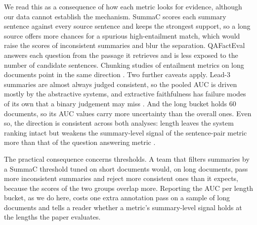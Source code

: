 We read this as a consequence of how each metric looks for evidence, although our data cannot establish the mechanism. SummaC scores each summary sentence against every source sentence and keeps the strongest support, so a long source offers more chances for a spurious high-entailment match, which would raise the scores of inconsistent summaries and blur the separation. QAFactEval answers each question from the passage it retrieves and is less exposed to the number of candidate sentences. Chunking studies of entailment metrics on long documents point in the same direction \citep{lattimer2023scale}. Two further caveats apply. Lead-3 summaries are almost always judged consistent, so the pooled AUC is driven mostly by the abstractive systems, and extractive faithfulness has failure modes of its own that a binary judgement may miss \citep{zhang2023extractive}. And the long bucket holds 60 documents, so its AUC values carry more uncertainty than the overall ones. Even so, the direction is consistent across both analyses: length leaves the system ranking intact but weakens the summary-level signal of the sentence-pair metric \citep{laban2022summac} more than that of the question answering metric \citep{fabbri2022qafacteval}.

The practical consequence concerns thresholds. A team that filters summaries by a SummaC threshold tuned on short documents would, on long documents, pass more inconsistent summaries and reject more consistent ones than it expects, because the scores of the two groups overlap more. Reporting the AUC per length bucket, as we do here, costs one extra annotation pass on a sample of long documents and tells a reader whether a metric's summary-level signal holds at the lengths the paper evaluates.
